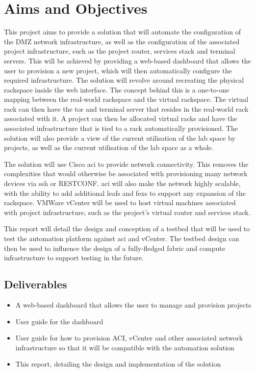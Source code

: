 \section{Aims and Objectives}
\label{intro:aims}

This project aims to provide
a solution that will automate the
configuration of the DMZ network
infrastructure, as well as the configuration of the associated project
infrastructure, such as the project router, services stack and terminal
servers. This will be achieved by providing a web-based dashboard that allows
the user to provision a new project, which will then automatically configure
the required infrastructure. The solution will revolve around recreating the
physical rackspace inside the web interface. The concept behind this is a
one-to-one mapping between the real-world rackspace and the virtual rackspace.
The virtual rack can then have the \gls{tor} and terminal server that resides
in the real-world rack associated with it. A project can then be allocated
virtual racks and have the associated infrastructure that is tied to a rack
automatically provisioned. The solution will also provide a view of the current
utilisation of the lab space by projects, as well as the current utilisation of
the lab space as a whole.

The solution will use Cisco \gls{aci} to provide
network connectivity. This removes the complexities that would otherwise be
associated with provisioning many network devices via \gls{ssh} or RESTCONF.
\gls{aci} will also make the network highly scalable, with the ability to add
additional leafs and \gls{fex}s to support any expansion of the rackspace.
VMWare vCenter will be used to host virtual machines associated with project
infrastructure, such as the project's virtual router and services stack.

This
report will detail the design and conception of a testbed that will be used to
test the automation platform against \gls{aci} and vCenter. The testbed design
can then be used to influence the design of a fully-fledged fabric and compute infrastructure to support testing in the future.
\subsection{Deliverables}
\label{intro:aims:deliverables}

\begin{itemize}
    \item A web-based dashboard that allows the user to manage
          and provision projects
    \item User guide for the dashboard

    \item User guide for how to provision ACI, vCenter and other associated
          network infrastructure so that it will be compatible with the automation
          solution
    \item This report, detailing the design and implementation of the
          solution
\end{itemize}


